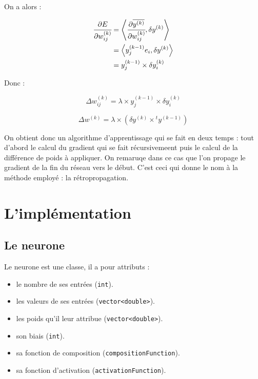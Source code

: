 On a alors :

\begin{align*}
\cfrac{\partial E}{\partial w_{ij}^{(k)}} &= \left\langle\cfrac{\partial \overline{y^{(k)}}}{\partial w_{ij}^{(k)}} ,\delta y^{(k)}\right\rangle\\
&= \left\langle y^{(k-1)}_j e_i,\delta y^{(k)}\right\rangle\\
& = y^{(k-1)}_j \times \delta y^{(k)}_i
\end{align*}

Donc :

\[\Delta w^{(k)}_{ij} = \lambda \times y^{(k-1)}_j \times \delta y^{(k)}_i\]

\[\Delta w^{(k)} = \lambda \times (\delta y^{(k)} \times {}^t \! y^{(k-1)})\]

On obtient donc un algorithme d'apprentissage qui se fait en deux temps : tout d'abord le calcul du gradient qui se fait récursivemeent puis le calcul de la différence de poids à appliquer. On remaruqe dans ce cas que l'on propage le gradient de la fin du réseau vers le début. C'est ceci qui donne le nom à la méthode employé : la rétropropagation.

\section{L'implémentation}

\subsection{Le neurone}

Le neurone est une classe, il a pour attributs :
\begin{itemize}
  \item le nombre de ses entrées (\verb+int+).
  \item les valeurs de ses entrées (\verb+vector<double>+).
  \item les poids qu'il leur attribue (\verb+vector<double>+).
  \item son biais (\verb+int+).
  \item sa fonction de composition (\verb+compositionFunction+).
  \item sa fonction d'activation (\verb+activationFunction+).
\end{itemize}

\medskip

